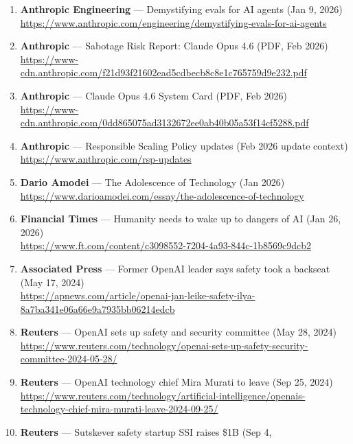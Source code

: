 \documentclass[
]{article}
\begin{document}
\begin{enumerate}
  \textbf{Anthropic Engineering} --- Effective context engineering for
  AI agents (Sep 29, 2025)\\
  \url{https://www.anthropic.com/engineering/effective-context-engineering-for-ai-agents}
\item
  \textbf{Anthropic Engineering} --- Demystifying evals for AI agents
  (Jan 9, 2026)\\
  \url{https://www.anthropic.com/engineering/demystifying-evals-for-ai-agents}
\item
  \textbf{Anthropic} --- Sabotage Risk Report: Claude Opus 4.6 (PDF, Feb
  2026)\\
  \url{https://www-cdn.anthropic.com/f21d93f21602ead5cdbecb8c8e1c765759d9e232.pdf}
\item
  \textbf{Anthropic} --- Claude Opus 4.6 System Card (PDF, Feb 2026)\\
  \url{https://www-cdn.anthropic.com/0dd865075ad3132672ee0ab40b05a53f14cf5288.pdf}
\item
  \textbf{Anthropic} --- Responsible Scaling Policy updates (Feb 2026
  update context)\\
  \url{https://www.anthropic.com/rsp-updates}
\item
  \textbf{Dario Amodei} --- The Adolescence of Technology (Jan 2026)\\
  \url{https://www.darioamodei.com/essay/the-adolescence-of-technology}
\item
  \textbf{Financial Times} --- Humanity needs to wake up to dangers of
  AI (Jan 26, 2026)\\
  \url{https://www.ft.com/content/c3098552-7204-4a93-844c-1b8569c9dcb2}
\item
  \textbf{Associated Press} --- Former OpenAI leader says safety took a
  backseat (May 17, 2024)\\
  \url{https://apnews.com/article/openai-jan-leike-safety-ilya-8a7ba341e06a66e9a7935bb06214edcb}
\item
  \textbf{Reuters} --- OpenAI sets up safety and security committee (May
  28, 2024)\\
  \url{https://www.reuters.com/technology/openai-sets-up-safety-security-committee-2024-05-28/}
\item
  \textbf{Reuters} --- OpenAI technology chief Mira Murati to leave (Sep
  25, 2024)\\
  \url{https://www.reuters.com/technology/artificial-intelligence/openais-technology-chief-mira-murati-leave-2024-09-25/}
\item
  \textbf{Reuters} --- Sutskever safety startup SSI raises \$1B (Sep 4,

\end{enumerate}
\end{document}

